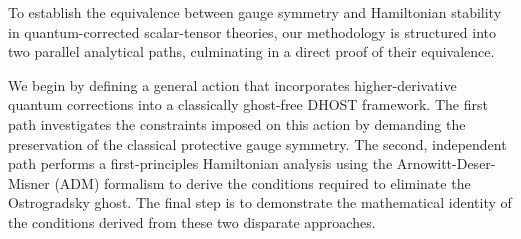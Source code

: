 \documentclass[twocolumn]{aastex631}
\begin{document}
To establish the equivalence between gauge symmetry and Hamiltonian stability in quantum-corrected scalar-tensor theories, our methodology is structured into two parallel analytical paths, culminating in a direct proof of their equivalence.

We begin by defining a general action that incorporates higher-derivative quantum corrections into a classically ghost-free DHOST framework. The first path investigates the constraints imposed on this action by demanding the preservation of the classical protective gauge symmetry. The second, independent path performs a first-principles Hamiltonian analysis using the Arnowitt-Deser-Misner (ADM) formalism to derive the conditions required to eliminate the Ostrogradsky ghost. The final step is to demonstrate the mathematical identity of the conditions derived from these two disparate approaches.
\end{document}
